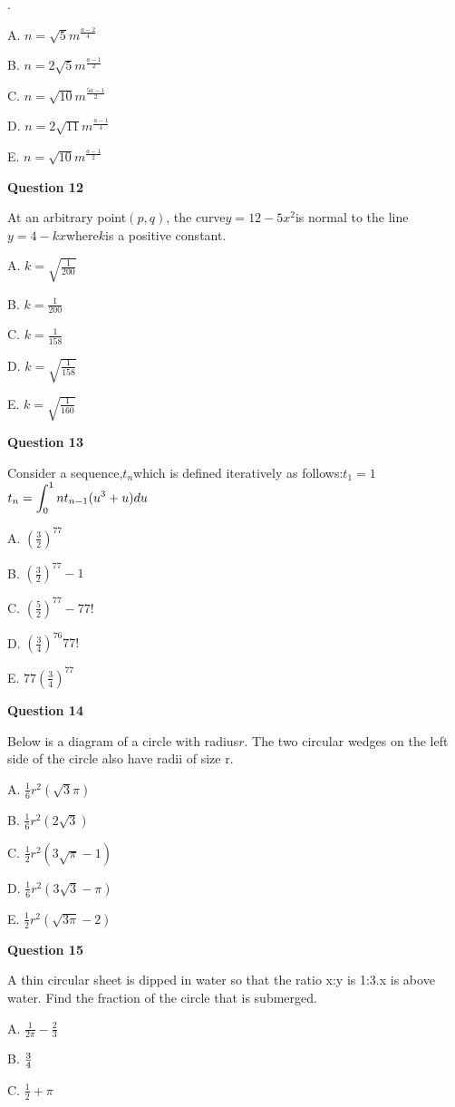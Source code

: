 .

A. \(n=\sqrt5m^{\frac{a-2}{4}}\)

B. \(n=2\sqrt5m^{\frac{a-1}{2}}\)

C. \(n=\sqrt{10}m^{\frac{5a-1}{2}}\)

D. \(n=2\sqrt{11}m^{\frac{a-1}{4}}\)

E. \(n=\sqrt{10}m^{\frac{a-1}{2}}\)


\textbf{Question 12}

At an arbitrary point\((p, q)\), the curve\(y=12-5x^2\)is normal to the line\(y=4-kx\)where\(k\)is a positive constant.

A. \(k=\sqrt{\frac{1}{200}}\)

B. \(k=\frac{1}{200}\)

C. \(k=\frac{1}{158}\)

D. \(k=\sqrt{\frac{1}{158}}\)

E. \(k=\sqrt{\frac{1}{160}}\)


\textbf{Question 13}

Consider a sequence,\(t_n\)which is defined iteratively as follows:\(t_1=1\)\(t_n=\displaystyle\int^1_0nt_{n-1}(u^3+u)\space du\)

A. \((\frac{3}{2})^{77}\)

B. \((\frac{3}{2})^{77}-1\)

C. \((\frac{5}{2})^{77}-77!\)

D. \((\frac{3}{4})^{76}77!\)

E. \(77(\frac{3}{4})^{77}\)


\textbf{Question 14}

Below is a diagram of a circle with radius\(r\). The two circular wedges on the left side of the circle also have radii of size r.

A. \(\frac{1}{6}r^2(\sqrt3\pi)\)

B. \(\frac{1}{6}r^2(2\sqrt3)\)

C. \(\frac{1}{2}r^2(3\sqrt\pi-1)\)

D. \(\frac{1}{6}r^2(3\sqrt3-\pi)\)

E. \(\frac{1}{2}r^2(\sqrt{3\pi}-2)\)


\textbf{Question 15}

A thin circular sheet is dipped in water so that the ratio x:y is 1:3.x is above water. Find the fraction of the circle that is submerged.

A. \(\frac{1}{2\pi}-\frac{2}{3}\)

B. \(3\over4\)

C. \(\frac{1}{2}+\pi\)


